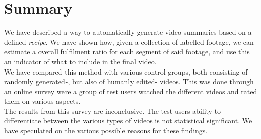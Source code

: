 \section{Summary}
%
We have described a way to automatically generate video summaries based on a defined \textit{recipe}. We have shown how, given a collection of labelled footage, we can estimate a overall fulfilment ratio for each segment of said footage, and use this an indicator of what to include in the final video.\\
We have compared this method with various control groups, both consisting of randomly generated-, but also of humanly edited- videos. This was done through an online survey were a group of test users watched the different videos and rated them on various aspects.\\
The results from this survey are inconclusive. The test users ability to differentiate between the various types of videos is not statistical significant. We have speculated on the various possible reasons for these findings.\\
%

%